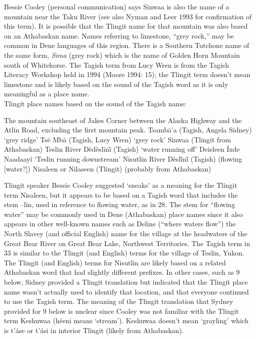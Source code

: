 Bessie Cooley (personal communication) says Sinwaa is also the name of a mountain near the Taku River (see also Nyman and Leer 1993 for confirmation of this term). It is possible that the Tlingit name for that mountain was also based on an Athabaskan name. Names referring to limestone, “grey rock,” may be common in Dene languages of this region. There is a Southern Tutchone name of the same form, \textit{Sima} (grey rock) which is the name of Golden Horn Mountain south of Whitehorse. The Tagish term from Lucy Wren is from the Tagish Literacy Workshop held in 1994 (Moore 1994: 15); the Tlingit term doesn’t mean limestone and is likely based on the sound of the Tagish word as it is only meaningful as a place name.\\

Tlingit place names based on the sound of the Tagish name:
\begin{exe}
 The mountain southeast of Jakes Corner between the Alaska Highway and the Atlin Road, excluding the first mountain peak.
	\sn Tsambā’a (Tagish, Angela Sidney)	`grey ridge'
	\sn Tsē Mbā (Tagish, Lucy Wren)		`grey rock'
	\sn Sinwaa (Tlingit from Athabaskan)
 Teslin River
	\sn Dèdèslīnī̀  (Tagish)			`water running off'
	\sn Deisleen Íxde Naadaayí		`Teslin running downstream'
 Nisutlin River
	\sn Dèslī́nī́ (Tagish)			(flowing [water?])
	\sn Nisaleen or Nilaseen (Tlingit)		(probably from Athabaskan)
\end{exe}



Tlingit speaker Bessie Cooley suggested ‘sneaks’ as a meaning for the Tlingit term Nisaleen, but it appears to be based on a Tagish word that includes the stem –līn, used in reference to flowing water, as in 28. The stem for “flowing water” may be commonly used in Dene (Athabaskan) place names since it also appears in other well-known names such as Deline (“where waters flow”) the North Slavey (and official English) name for the village at the headwaters of the Great Bear River on Great Bear Lake, Northwest Territories. The Tagish term in 33 is similar to the Tlingit (and English) terms for the village of Teslin, Yukon. The Tlingit (and English) terms for Nisutlin are likely based on a related Athabaskan word that had slightly different prefixes.
In other cases, such as 9 below, Sidney provided a Tlingit translation but indicated that the Tlingit place name wasn’t actually used to identify that location, and that everyone continued to use the Tagish term. The meaning of the Tlingit translation that Sydney provided for 9 below is unclear since Cooley was not familiar with the Tlingit term Keshuwaa (héeni means ‘stream’). Keshuwaa doesn’t mean ‘grayling’ which is t’áse or t’ási in interior Tlingit (likely from Athabaskan).\\

